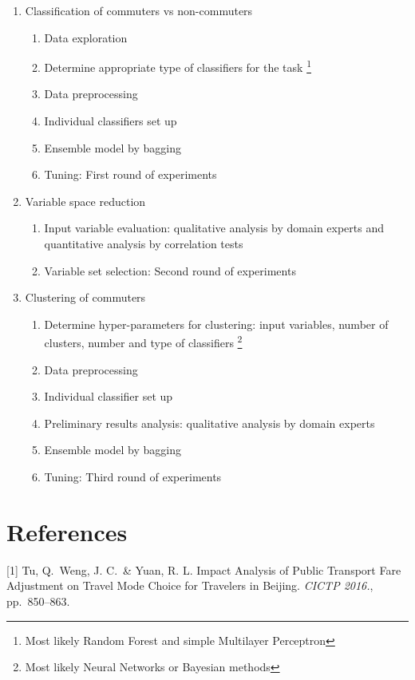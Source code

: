 \documentclass{article}
\begin{document}
\begin{enumerate}
\item[Stage 1:] Classification of commuters vs non-commuters
	\begin{enumerate}
	\item Data exploration
	\item Determine appropriate type of classifiers for the task \footnote{Most likely Random Forest and simple Multilayer Perceptron}
	\item Data preprocessing
	\item Individual classifiers set up 
	\item Ensemble model by bagging
	\item Tuning: First round of experiments
	\end{enumerate}

\item[Stage 2:] Variable space reduction 
	\begin{enumerate}
	\item Input variable evaluation: qualitative analysis by domain experts and quantitative analysis by correlation tests
	\item Variable set selection: Second round of experiments
	\end{enumerate}

\item[Stage 3:] Clustering of commuters
	\begin{enumerate}
	\item Determine hyper-parameters for clustering: input variables, number of clusters, number and type of classifiers \footnote{Most likely Neural Networks or Bayesian methods}
	\item Data preprocessing
	\item Individual classifier set up
	\item Preliminary results analysis: qualitative analysis by domain experts
	\item Ensemble model by bagging
	\item Tuning: Third round of experiments
	\end{enumerate}

\end{enumerate}



\section*{References}

\small

[1] Tu, Q.\ Weng, J. C.\ \& Yuan, R. L. Impact Analysis of Public Transport Fare Adjustment on Travel Mode Choice for Travelers in Beijing. {\it CICTP 2016.}, pp.\ 850--863.
\end{document}
